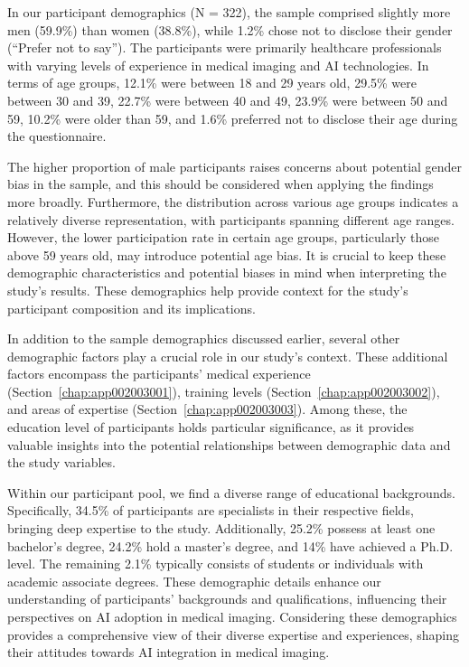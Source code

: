 \textcolor{revised}{In our participant demographics (N = 322), the sample comprised slightly more men (59.9\%) than women (38.8\%), while 1.2\% chose not to disclose their gender (``Prefer not to say'').
The participants were primarily healthcare professionals with varying levels of experience in medical imaging and \ac{AI} technologies.
In terms of age groups, 12.1\% were between 18 and 29 years old, 29.5\% were between 30 and 39, 22.7\% were between 40 and 49, 23.9\% were between 50 and 59, 10.2\% were older than 59, and 1.6\% preferred not to disclose their age during the questionnaire.}

\textcolor{revised}{The higher proportion of male participants raises concerns about potential gender bias in the sample, and this should be considered when applying the findings more broadly.
Furthermore, the distribution across various age groups indicates a relatively diverse representation, with participants spanning different age ranges.
However, the lower participation rate in certain age groups, particularly those above 59 years old, may introduce potential age bias.
It is crucial to keep these demographic characteristics and potential biases in mind when interpreting the study's results.
These demographics help provide context for the study's participant composition and its implications.}

\textcolor{revised}{In addition to the sample demographics discussed earlier, several other demographic factors play a crucial role in our study's context.
These additional factors encompass the participants' medical experience (Section~\ref{chap:app002003001}), training levels (Section~\ref{chap:app002003002}), and areas of expertise (Section~\ref{chap:app002003003}).
Among these, the education level of participants holds particular significance, as it provides valuable insights into the potential relationships between demographic data and the study variables.}

\textcolor{revised}{Within our participant pool, we find a diverse range of educational backgrounds.
Specifically, 34.5\% of participants are specialists in their respective fields, bringing deep expertise to the study.
Additionally, 25.2\% possess at least one bachelor's degree, 24.2\% hold a master's degree, and 14\% have achieved a Ph.D. level.
The remaining 2.1\% typically consists of students or individuals with academic associate degrees.
These demographic details enhance our understanding of participants' backgrounds and qualifications, influencing their perspectives on \ac{AI} adoption in medical imaging.
Considering these demographics provides a comprehensive view of their diverse expertise and experiences, shaping their attitudes towards \ac{AI} integration in medical imaging.}

